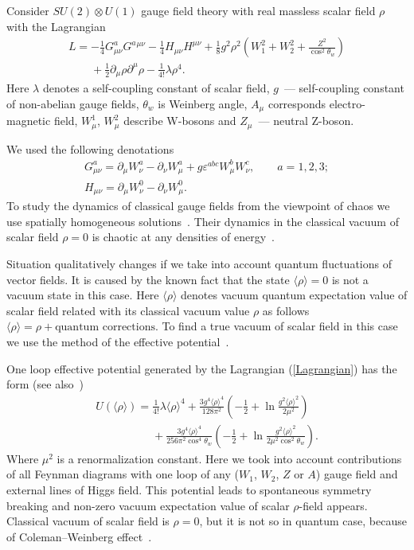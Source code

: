 \documentclass[a4paper,12pt]{article}
\begin{document}
 Consider $SU(2)\otimes U(1)$ gauge field theory with real massless scalar
 field $\rho$ with the Lagrangian
\begin{gather}
 L=-\frac{1}{4}G_{\mu \nu }^{a}G^{a}{}^{\mu \nu }-\frac{1}{4}H_{\mu \nu
}H^{\mu \nu }+\frac{1}{8}g^{2}\rho ^{2}\left( W_{1}^{2}+W_{2}^{2}+\frac{Z^{2}%
}{\cos ^{2}{\theta _{w}}}\right) \nonumber\\
\phantom{L={}}{}+\frac{1}{2}\partial _{\mu }\rho \partial ^{\mu }\rho -
\frac{1}{4!}\lambda \rho ^{4}.\label{Lagrangian}
\end{gather}
Here $\lambda $ denotes a self-coupling constant of scalar field, $g$~---
self-coupling constant of non-abelian gauge fields, $\theta _{w}$ is Weinberg angle,
$A_{\mu }$ corresponds electro-magnetic field, $W_{\mu }^{1}$, $W_{\mu }^{2}$ describe
W-bosons and $Z_{\mu }$~--- neutral Z-boson.

We used the following denotations
\begin{gather*}
G^{a}_{\mu \nu}=\partial_{\mu}W^{a}_{\nu} -
\partial_{\nu}W^{a}_{\mu} +
g\varepsilon^{abc}W^{b}_{\mu}W^{c}_{\nu} , \qquad a=1,2,3;\\
H_{\mu \nu} = \partial_{\mu}W^{0}_{\nu} -
\partial_{\nu}W^{0}_{\mu}.
\end{gather*}
To study the dynamics of classical gauge fields from the viewpoint of chaos we use
spatially homogeneous solutions~\cite{SHS}. Their dynamics in the classical vacuum of
scalar field $\rho =0$ is chaotic at any densities of energy~\cite{Savvidy}.

Situation qualitatively changes if we take into account quantum fluctuations of vector
fields. It is caused by the known fact that the state $\langle \rho\rangle = 0$ is not
a vacuum state in this case. Here $\langle \rho\rangle $ denotes vacuum quantum
expectation value of scalar field related with its classical vacuum value $\rho$ as
follows $\langle \rho \rangle= \rho + \mbox{quantum corrections}$. To find a true
vacuum of scalar field in this case we use the method of the effective
potential~\cite{effpot}.

One loop  effective potential generated by the Lagrangian (\ref{Lagrangian}) has the
form (see also~\cite{Huang})
\begin{gather}
 U\left( \langle \rho\rangle \right)
= \frac{1}{4!}\lambda \langle\rho \rangle^{4} + \frac{3g^{4}\langle \rho
\rangle^{4}}{128\pi ^{2}}\left( -\frac{1}{2}+\ln {\frac{
g^{2}\langle \rho\rangle^{2}}{2\mu ^{2}}}\right)  \nonumber \\
\phantom{U\left( \langle \rho\rangle \right)=}{} +\frac{3g^{4}\langle \rho\rangle
^{4}}{256\pi ^{2}\cos ^{4}{\theta _{w}}}\left( -\frac{1}{2} +\ln {\frac{g^{2}\langle
\rho \rangle^{2}}{2\mu ^{2}\cos ^{2}{\theta _{w}}}}\right).\label{eff}
\end{gather}
Where $\mu^{2}$ is a renormalization constant. Here we took into account contributions
of all Feynman diagrams with one loop of any ($W_{1}$, $W_{2}$, $Z$ or $A$) gauge
field and external lines of Higgs field. This potential leads to spontaneous symmetry
breaking and non-zero vacuum expectation value of scalar $\rho$-field appears.
Classical vacuum of scalar field is $\rho =0$, but it is not so in quantum case,
because of Coleman--Weinberg effect~\cite{effpot}.
\end{document}

